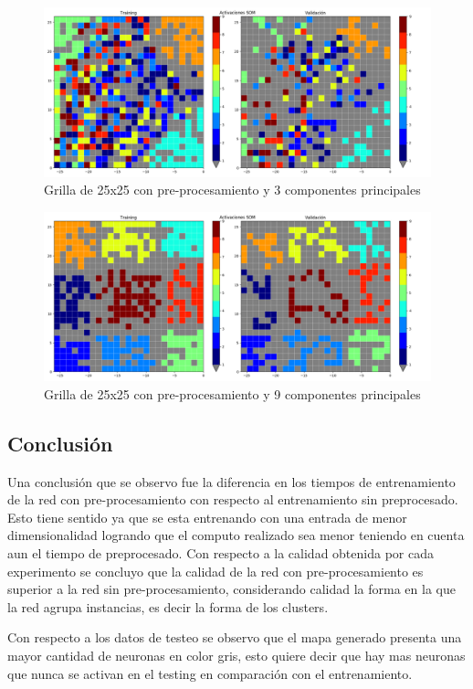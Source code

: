 \begin{figure}[H]
  \includegraphics[width=160mm]{imagenes/som_25_25_3_preprocess.png}
  \caption{Grilla de 25x25 con pre-procesamiento y 3 componentes principales}
\end{figure}

\begin{figure}[H]
  \includegraphics[width=160mm]{imagenes/som_25_25_9_preprocess.png}
  \caption{Grilla de 25x25 con pre-procesamiento y 9 componentes principales}
\end{figure}


\clearpage
\subsection{Conclusión}
Una conclusión que se observo fue la diferencia en los tiempos de entrenamiento
de la red con pre-procesamiento con respecto al entrenamiento sin preprocesado.
Esto tiene sentido ya que se esta entrenando con una entrada de menor
dimensionalidad logrando que el computo realizado sea menor teniendo en cuenta
aun el tiempo de  preprocesado.  Con respecto a la calidad obtenida por cada
experimento se concluyo que la calidad de la red con pre-procesamiento es
superior a la red sin pre-procesamiento, considerando calidad
la forma en la que la red agrupa instancias, es decir la forma de los clusters.

Con respecto a los datos de testeo se observo que el mapa generado presenta una
mayor cantidad de neuronas en color gris, esto quiere decir que hay mas
neuronas que nunca se activan en el testing en comparación con el
entrenamiento.


